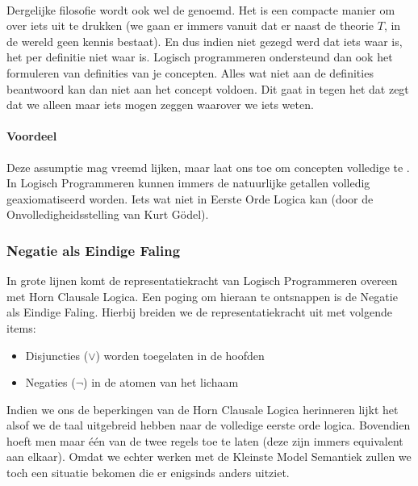 \paragraph{}Dergelijke filosofie wordt ook wel de  genoemd. Het is een compacte manier om  over iets uit te drukken (we gaan er immers vanuit dat er naast de theorie $T$, in de wereld geen kennis bestaat). En dus indien niet gezegd werd dat iets waar is, het per definitie niet waar is. Logisch programmeren ondersteund dan ook het formuleren van definities van je concepten. Alles wat niet aan de definities beantwoord kan dan niet aan het concept voldoen. Dit gaat in tegen het  dat zegt dat we alleen maar iets mogen zeggen waarover we iets weten.
\paragraph{Voordeel}Deze assumptie mag vreemd lijken, maar laat ons toe om concepten volledige te . In Logisch Programmeren kunnen immers de natuurlijke getallen volledig geaxiomatiseerd worden. Iets wat niet in Eerste Orde Logica kan (door de Onvolledigheidsstelling van Kurt Gödel).
\subsubsection{Negatie als Eindige Faling}
In grote lijnen komt de representatiekracht van Logisch Programmeren overeen met Horn Clausale Logica. Een poging om hieraan te ontsnappen is de Negatie als Eindige Faling. Hierbij breiden we de representatiekracht uit met volgende items:
\begin{itemize}
 \item Disjuncties ($\vee$) worden toegelaten in de hoofden
 \item Negaties ($\neg$) in de atomen van het lichaam
\end{itemize}
Indien we ons de beperkingen van de Horn Clausale Logica herinneren lijkt het alsof we de taal uitgebreid hebben naar de volledige eerste orde logica. Bovendien hoeft men maar één van de twee regels toe te laten (deze zijn immers equivalent aan elkaar). Omdat we echter werken met de Kleinste Model Semantiek zullen we toch een situatie bekomen die er enigsinds anders uitziet.
